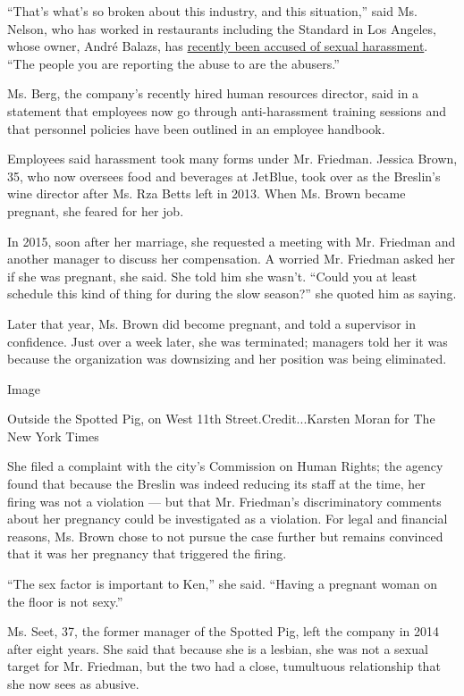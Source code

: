 ``That's what's so broken about this industry, and this situation,''
said Ms. Nelson, who has worked in restaurants including the Standard in
Los Angeles, whose owner, André Balazs, has
\href{https://www.nytimes.com/2017/11/09/style/andre-balazs-accused-of-groping-standard-chateau-marmont.html?_r=0}{recently
been accused of sexual harassment}. ``The people you are reporting the
abuse to are the abusers.''

Ms. Berg, the company's recently hired human resources director, said in
a statement that employees now go through anti-harassment training
sessions and that personnel policies have been outlined in an employee
handbook.

Employees said harassment took many forms under Mr. Friedman. Jessica
Brown, 35, who now oversees food and beverages at JetBlue, took over as
the Breslin's wine director after Ms. Rza Betts left in 2013. When Ms.
Brown became pregnant, she feared for her job.

In 2015, soon after her marriage, she requested a meeting with Mr.
Friedman and another manager to discuss her compensation. A worried Mr.
Friedman asked her if she was pregnant, she said. She told him she
wasn't. ``Could you at least schedule this kind of thing for during the
slow season?'' she quoted him as saying.

Later that year, Ms. Brown did become pregnant, and told a supervisor in
confidence. Just over a week later, she was terminated; managers told
her it was because the organization was downsizing and her position was
being eliminated.

Image

Outside the Spotted Pig, on West 11th Street.Credit...Karsten Moran for
The New York Times

She filed a complaint with the city's Commission on Human Rights; the
agency found that because the Breslin was indeed reducing its staff at
the time, her firing was not a violation --- but that Mr. Friedman's
discriminatory comments about her pregnancy could be investigated as a
violation. For legal and financial reasons, Ms. Brown chose to not
pursue the case further but remains convinced that it was her pregnancy
that triggered the firing.

``The sex factor is important to Ken,'' she said. ``Having a pregnant
woman on the floor is not sexy.''

Ms. Seet, 37, the former manager of the Spotted Pig, left the company in
2014 after eight years. She said that because she is a lesbian, she was
not a sexual target for Mr. Friedman, but the two had a close,
tumultuous relationship that she now sees as abusive.

